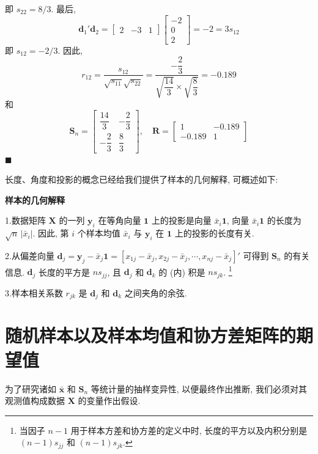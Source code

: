 即 $s_{22}=8/3$. 最后,
\[
\mathbf{d}_{1}'\mathbf{d}_{2}=\begin{bmatrix}2&-3&1\end{bmatrix}\begin{bmatrix}-2\\0\\2\end{bmatrix}=-2=3s_{12}
\]
即 $s_{12}=-2/3$. 因此,
\[
r_{12}=\frac{s_{12}}{\sqrt{s_{11}}\sqrt{s_{22}}}=\frac{-\dfrac{2}{3}}{\sqrt{\dfrac{14}{3}}\times\sqrt{\dfrac{8}{3}}}=-0.189
\]
和
\[
\mathbf{S}_{n}=\begin{bmatrix}\dfrac{14}{3}&-\dfrac{2}{3}\\[8pt]-\dfrac{2}{3}&\dfrac{8}{3}\end{bmatrix},\quad
\mathbf{R}=\begin{bmatrix}1&-0.189\\-0.189&1\end{bmatrix}
\]
\hfill$\blacksquare$

长度、角度和投影的概念已经给我们提供了样本的几何解释, 可概述如下:

\begin{mvbox}
\begin{center}
\textbf{样本的几何解释}
\end{center}
1.\quad 数据矩阵 $\mathbf{X}$ 的一列 $\mathbf{y}_{i}$ 在等角向量 $\mathbf{1}$ 上的投影是向量 $\bar{x}_{i}\mathbf{1}$, 向量 $\bar{x}_{i}\mathbf{1}$ 的长度为 $\sqrt{n}\,|\bar{x}_{i}|$. 因此, 第 $i$ 个样本均值 $\bar{x}_{i}$ 与 $\mathbf{y}_{i}$ 在 $\mathbf{1}$ 上的投影的长度有关.

2.\quad 从偏差向量 $\mathbf{d}_{j}=\mathbf{y}_{j}-\bar{x}_{j}\mathbf{1}=[x_{1j}-\bar{x}_{j},x_{2j}-\bar{x}_{j},\cdots,x_{nj}-\bar{x}_{j}]'$ 可得到 $\mathbf{S}_{n}$ 的有关信息. $\mathbf{d}_{j}$ 长度的平方是 $ns_{jj}$, 且 $\mathbf{d}_{j}$ 和 $\mathbf{d}_{k}$ 的 (内) 积是 $ns_{jk}$. \footnote{{\footnotesize 当因子 $n-1$ 用于样本方差和协方差的定义中时, 长度的平方以及内积分别是 $(n-1)s_{jj}$ 和 $(n-1)s_{jk}$.}}

3.\quad 样本相关系数 $r_{jk}$ 是 $\mathbf{d}_{j}$ 和 $\mathbf{d}_{k}$ 之间夹角的余弦.
\end{mvbox}

\section{随机样本以及样本均值和协方差矩阵的期望值}
\label{sec:3.3}

为了研究诸如 $\bar{\mathbf{x}}$ 和 $\mathbf{S}_{n}$ 等统计量的抽样变异性, 以便最终作出推断, 我们必须对其观测值构成数据 $\mathbf{X}$ 的变量作出假设.

